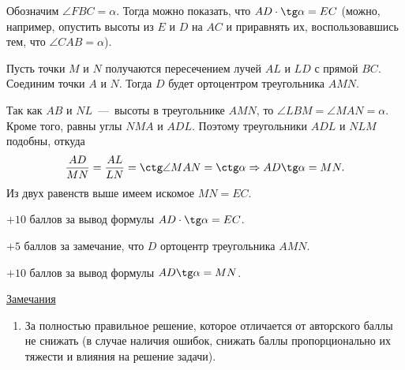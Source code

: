 \solutionSection
Обозначим $\angle FBC = \alpha$. Тогда можно показать, что $AD \cdot \tg \alpha = EC$ (можно, например, опустить высоты из $E$ и $D$ на $AC$ и приравнять их, воспользовавшись тем, что $\angle CAB = \alpha$).
	 
Пусть точки $M$ и $N$ получаются пересечением лучей $AL$ и $LD$ с прямой $BC$. Соединим точки $A$ и $N$. Тогда $D$ будет ортоцентром треугольника $AMN$.
	
Так как $AB$ и $NL$~---~высоты в треугольнике $AMN$, то $\angle LBM = \angle MAN = \alpha$. Кроме того, равны углы $NMA$ и $ADL$. Поэтому треугольники $ADL$ и $NLM$ подобны, откуда
$$\frac{AD}{MN} = \frac{AL}{LN} = \ctg \angle MAN = \ctg \alpha \Rightarrow AD \tg \alpha = MN.$$
Из двух равенств выше имеем искомое $MN = EC$.

\additionalCriteria

$+10$ баллов за вывод формулы $AD \cdot \tg \alpha = EC$.
	
	$+5$ баллов за замечание, что $D$ ортоцентр треугольника $AMN$.
	
	$+10$ баллов за вывод формулы $AD \tg \alpha = MN$.
	
	\underline{Замечания} 
\begin{enumerate}
	\item За полностью правильное решение, 
	которое отличается от авторского баллы не снижать
	(в случае наличия ошибок, снижать баллы пропорционально 
	их тяжести и влияния на решение задачи).
\end{enumerate}